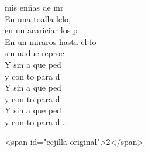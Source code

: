 \documentclass[12pt]{article}
\begin{document}
\begin{multicols*}{2}
\begin{cancion}
\begin{chorus}
	mis enñas de mr\\
	En una toalla lelo, \\
	en un acariciar los p\\
	En un miraros hasta el fo \\
	sin nadue reproc\\
	Y sin a que ped\\
	y con to para d\\
	Y sin a que ped\\
	y con to para d\\
	Y sin a que ped\\
	y con to para d...\\
	\end{chorus}%
<span id="cejilla-original">2</span>\\
\end{cancion}%


\end{multicols*}
\end{document}
